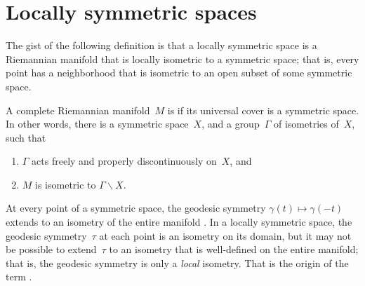 \section{Locally symmetric spaces}

The gist of the following definition is that a locally symmetric
space is a Riemannian manifold that is locally isometric to a
symmetric space; that is, every point has a neighborhood that is
isometric to an open subset of some symmetric space.

\begin{defn}
 A complete Riemannian manifold~$M$ is  if
its universal cover is a symmetric space. In other words, there is a
symmetric space~$X$, and a group~$\Gamma$ of isometries of~$X$, such
that 
 \begin{enumerate}
 \item $\Gamma$ acts freely and properly discontinuously on~$X$, and
 \item $M$ is isometric to $\Gamma \backslash X$.
 \end{enumerate}
 \end{defn}

\begin{rem} \label{locsymm<>geodsymm}
 At every point of a symmetric space, the geodesic symmetry $\gamma(t) \mapsto
\gamma(-t)$ extends to an isometry of the entire manifold
. In a locally symmetric space, the geodesic
symmetry~$\tau$ at each point is an isometry on its domain, but it may
not be possible to extend~$\tau$ to an isometry that is well-defined
on the entire manifold; that is, the geodesic symmetry is only a
\emph{local} isometry. That is the origin of the term .
 \end{rem}

